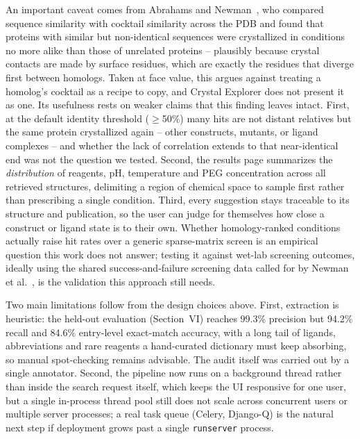 An important caveat comes from Abrahams and
Newman~\cite{abrahams2019blasting}, who compared sequence similarity
with cocktail similarity across the PDB and found that proteins with
similar but non-identical sequences were crystallized in conditions no
more alike than those of unrelated proteins -- plausibly because crystal
contacts are made by surface residues, which are exactly the residues
that diverge first between homologs. Taken at face value, this argues
against treating a homolog's cocktail as a recipe to copy, and Crystal
Explorer does not present it as one. Its usefulness rests on weaker
claims that this finding leaves intact. First, at the default identity
threshold ($\geq$50\%) many hits are not distant relatives but the same
protein crystallized again -- other constructs, mutants, or ligand
complexes -- and whether the lack of correlation extends to that
near-identical end was not the question we tested. Second, the results
page summarizes the \emph{distribution} of reagents, pH, temperature
and PEG concentration across all retrieved structures, delimiting a
region of chemical space to sample first rather than prescribing a
single condition. Third, every suggestion stays traceable to its
structure and publication, so the user can judge for themselves how
close a construct or ligand state is to their own. Whether
homology-ranked conditions actually raise hit rates over a generic
sparse-matrix screen is an empirical question this work does not
answer; testing it against wet-lab screening outcomes, ideally using the
shared success-and-failure screening data called for by Newman et
al.~\cite{newman2012need}, is the validation this approach still needs.

Two main limitations follow from the design choices above. First,
extraction is heuristic: the held-out evaluation (Section~VI)
reaches 99.3\% precision but 94.2\% recall and 84.6\%
entry-level exact-match accuracy, with a long tail of ligands,
abbreviations and rare reagents a hand-curated dictionary must keep
absorbing, so manual spot-checking remains advisable. The audit itself
was carried out by a single annotator. Second, the pipeline now runs on a
background thread rather than inside the search request itself, which
keeps the UI responsive for one user, but a single in-process thread
pool still does not scale across concurrent users or multiple server
processes; a real task queue (Celery, Django-Q) is the natural next
step if deployment grows past a single \texttt{runserver} process.

